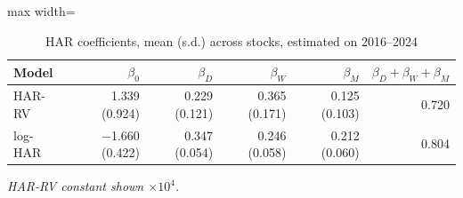 \begin{table}[H]
\centering
\caption{HAR coefficients, mean (s.d.) across stocks, estimated on 2016--2024}
\label{tab:harcoef}
\small
\begin{adjustbox}{max width=\textwidth}
\begin{tabular}{lrrrrr}
\toprule
Model & $\beta_0$ & $\beta_D$ & $\beta_W$ & $\beta_M$ & $\beta_D+\beta_W+\beta_M$ \\
\midrule
HAR-RV & 1.339 (0.924) & 0.229 (0.121) & 0.365 (0.171) & 0.125 (0.103) & 0.720 \\
log-HAR & $-$1.660 (0.422) & 0.347 (0.054) & 0.246 (0.058) & 0.212 (0.060) & 0.804 \\
\bottomrule
\end{tabular}
\end{adjustbox}
\par\smallskip\parbox{0.95\textwidth}{\footnotesize\itshape HAR-RV constant shown $\times10^{4}$.}
\end{table}

